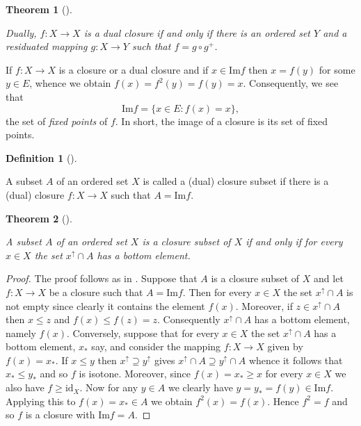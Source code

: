 \documentclass[
  letterpaper,
  10pt,
  reqno,
  twopage,
  openany]{book}
\theoremstyle{plain}
\theoremstyle{definition}
\theoremstyle{definition}
\newtheorem{definition}{Definition}[chapter]
\theoremstyle{definition}
\theoremstyle{plain}
\theoremstyle{plain}
\newtheorem{theorem}{Theorem}[chapter]
\theoremstyle{remark}
\begin{document}
\leavevmode{}%
\begin{theorem}[]\label{thm-}

Dually, \(f : X \to X\) is a dual closure if and only if there is an
ordered set \(Y\) and a residuated mapping \(g : X \to Y\) such that
\(f = g \circ g^+\).

\end{theorem}

If \(f : X \to X\) is a closure or a dual closure and if
\(x \in \text{Im} f\) then \(x = f(y)\) for some \(y \in E\), whence we
obtain \(f(x) = f^2(y) = f(y) = x\). Consequently, we see that \[
\text{Im}f = \{x \in E : f(x) = x\},
\] the set of \emph{fixed points} of \(f\). In short, the image of a
closure is its set of fixed points.

\leavevmode{}%
\begin{definition}[]\label{def-}

A subset \(A\) of an ordered set \(X\) is called a (dual) closure subset
if there is a (dual) closure \(f : X \to X\) such that
\(A = \text{Im} f\).

\end{definition}

\leavevmode{}%
\begin{theorem}[]\label{thm-}

A subset \(A\) of an ordered set \(X\) is a closure subset of \(X\) if
and only if for every \(x\in X\) the set \(x^{\uparrow} \cap A\) has a
bottom element.

\end{theorem}

\begin{proof}

The proof follows as in \cite[p. 11]{MR2126425}. Suppose that \(A\) is a
closure subset of \(X\) and let \(f : X \to X\) be a closure such that
\(A = \text{Im} f\). Then for every \(x \in X\) the set
\(x^{\uparrow} \cap A\) is not empty since clearly it contains the
element \(f(x)\). Moreover, if \(z \in x^{\uparrow} \cap A\) then
\(x\leq z\) and \(f(x)\leq f(z)=z\). Consequently
\(x^{\uparrow} \cap A\) has a bottom element, namely \(f(x)\).
Conversely, suppose that for every \(x \in X\) the set
\(x^{\uparrow} \cap A\) has a bottom element, \(x_*\) say, and consider
the mapping \(f : X \to X\) given by \(f(x) = x_*\). If \(x\leq y\) then
\(x^{\uparrow} \supseteq y^{\uparrow}\) gives
\(x^{\uparrow} \cap A \supseteq y^{\uparrow} \cap A\) whence it follows
that \(x_* \leq y_*\) and so \(f\) is isotone. Moreover, since
\(f(x) = x_* \geq x\) for every \(x \in X\) we also have
\(f\geq \text{id}_X\). Now for any \(y\in A\) we clearly have
\(y=y_*=f(y)\in\text{Im} f\). Applying this to \(f(x)=x_* \in A\) we
obtain \(f^2(x)=f(x)\). Hence \(f^2 =f\) and so \(f\) is a closure with
\(\text{Im} f = A\).

\end{proof}
\end{document}
